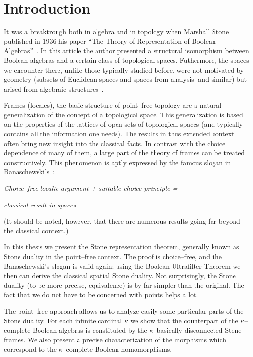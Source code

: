 \chapter{Introduction}

It was a breaktrough both in algebra and in topology when Marshall Stone published in 1936 his paper ``The Theory of Representation of Boolean Algebras''~\cite{stone1936theory}. In this article the author presented a structural isomorphism
between Boolean algebras and a certain class of topological spaces. Futhermore, the spaces we encounter there,
unlike those typically studied before, were not motivated by geometry (subsets of Euclidean spaces and spaces
from analysis, and similar) but arised from algebraic structures~\cite{johnstone1986stone}.

Frames (locales), the basic structure of point--free topology are a natural generalization of  the concept of a topological space. This generalization is based on the properties of the lattices of open sets of topological
spaces (and typically contains all the information one needs). The results in thus extended context often bring new insight into the classical facts. In contrast with the choice dependence of many of them, a large part of the theory of frames can be treated constructively. This phenomenon is aptly expressed by the famous slogan
in Banaschewski's~\cite{banaschewski1990proving}:

\smallskip

\centerline{\em Choice--free localic argument + suitable choice principle = }

\centerline{\em  classical result in spaces.}

\smallskip

\noindent (It should be noted, however, that there are numerous results going far beyond the classical context.)

\medskip

In this thesis we present the Stone representation theorem, generally known as Stone duality in the point--free context.
The proof is choice--free, and the Banaschewski's slogan is valid again: using the Boolean Ultrafilter Theorem we then can derive the classical spatial Stone duality. Not surprisingly, the Stone duality (to be more precise, equivalence)
is by far simpler than the original. The fact that we do not have to be concerned with points helps a lot.

\medskip

The point--free approach allows us to analyze easily some particular parts of the Stone duality. For each infinite cardinal $\kappa$ we show that the counterpart of the $\kappa$--complete Boolean algebras is constituted by the $\kappa$--basically disconnected Stone frames. We also present a precise characterization of the morphisms which correspond to the $\kappa$--complete Boolean homomorphisms.

